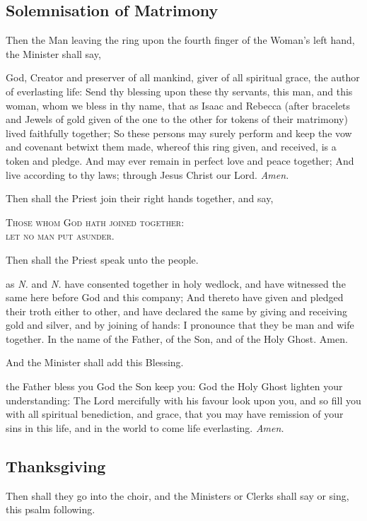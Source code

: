 \subsection{Solemnisation of Matrimony}
\begin{rubric}
	Then the Man leaving the ring upon the fourth finger of the Woman's left hand, the Minister shall say,
\end{rubric}
{} God, Creator and preserver of all mankind, giver of all spiritual grace, the author of everlasting life: Send thy blessing upon these thy servants, this man, and this woman, whom we bless in thy name, that as Isaac and Rebecca (after bracelets and Jewels of gold given of the one to the other for tokens of their matrimony) lived faithfully together; So these persons may surely perform and keep the vow and covenant betwixt them made, whereof this ring given, and received, is a token and pledge. And may ever remain in perfect love and peace together; And live according to thy laws; through Jesus Christ our Lord. \textit{Amen.}
\begin{rubric}
	Then shall the Priest join their right hands together, and say,
\end{rubric}
\begin{center}
    \textsc{Those whom God hath joined together:\\let no man put asunder.}
\end{center}
\begin{rubric}
	Then shall the Priest speak unto the people.
\end{rubric}
 as \textit{N.} and \textit{N.} have consented together in holy wedlock, and have witnessed the same here before God and this company; And thereto have given and pledged their troth either to other, and have declared the same by giving and receiving gold and silver, and by joining of hands: I pronounce that they be man and wife together. In the name of the Father, of the Son, and of the Holy Ghost. Amen.
\begin{rubric}
	And the Minister shall add this Blessing.
\end{rubric}
 the Father bless you {} God the Son keep you: God the Holy Ghost lighten your understanding: The Lord mercifully with his favour look upon you, and so fill you with all spiritual benediction, and grace, that you may have remission of your sins in this life, and in the world to come life everlasting. \textit{Amen.}

\subsection{Thanksgiving}
\begin{rubric}
	Then shall they go into the choir, and the Ministers or Clerks shall say or sing, this psalm following.
\end{rubric}
